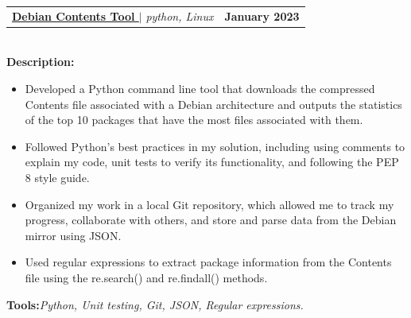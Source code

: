 \documentclass[letterpaper,11pt]{article}
\makeatletter
\newcommand{\resumeItem}[1]{
  \item\small{
    {#1 \vspace{-2pt}}
  }
}
\newcommand{\resumeProjectHeading}[2]{
    \item
    \begin{tabular*}{1.001\textwidth}{l@{\extracolsep{\fill}}r}
      \small#1 & \textbf{\small #2}\\
    \end{tabular*}\vspace{-7pt}
}
\newcommand{\resumeItemListStart}{\begin{itemize}}
\newcommand{\resumeItemListEnd}{\end{itemize}\vspace{-5pt}}
\makeatother
\begin{document}

%

                
                            
          \resumeProjectHeading
          {\textbf{\href{https://github.com/saiyakkshit?tab=repositories}{Debian Contents Tool
}} $|$ \emph{python, Linux \faGithub}}{January 2023}\\
          \vspace{6pt}
          \textbf{Description:}
           \vspace{-5pt}
          \resumeItemListStart
            \resumeItem{Developed a Python command line tool that downloads the compressed Contents file associated with a Debian architecture and outputs the statistics of the top 10 packages that have the most files associated with them.}
            \resumeItem{Followed Python's best practices in my solution, including using comments to explain my code, unit tests to verify its functionality, and following the PEP 8 style guide.}
            \resumeItem{Organized my work in a local Git repository, which allowed me to track my progress, collaborate with others, and store and parse data from the Debian mirror using JSON.}    
            \resumeItem{Used regular expressions to extract package information from the Contents file using the re.search() and re.findall() methods.}
          \resumeItemListEnd 
          \textbf{Tools:}\emph{Python, Unit testing, Git, JSON, Regular expressions.}
\end{document}
